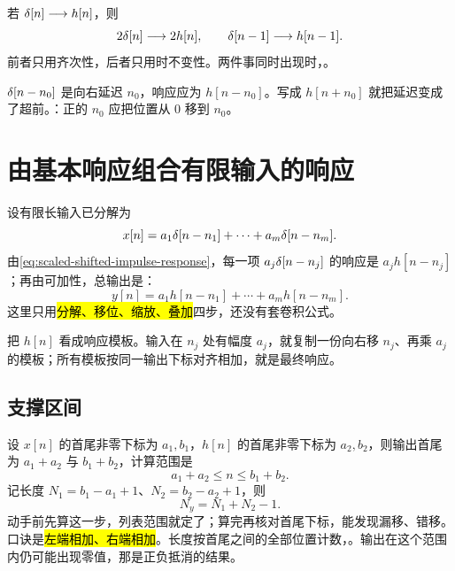 \begin{example}[缩放与移位]
  若 $\delta[n]\longrightarrow h[n]$，则
  \[
    2\delta[n]\longrightarrow2h[n],
    \qquad
    \delta[n-1]\longrightarrow h[n-1].
  \]
  前者只用齐次性，后者只用时不变性。两件事同时出现时，。
\end{example}

\begin{pitfall}[把平移方向写反]
  $\delta[n-n_0]$ 是向右延迟 $n_0$，响应应为 $h[n-n_0]$。写成 $h[n+n_0]$ 就把延迟变成了超前。：正的 $n_0$ 应把位置从 $0$ 移到 $n_0$。
\end{pitfall}

\section{由基本响应组合有限输入的响应}
\label{sec:lti-finite-superposition}

设有限长输入已分解为
\[
  x[n]=a_1\delta[n-n_1]+\cdots+a_m\delta[n-n_m].
\]
由\cref{eq:scaled-shifted-impulse-response}，每一项 $a_j\delta[n-n_j]$ 的响应是 $a_jh[n-n_j]$；再由可加性，总输出是：
\begin{equation}
  y[n]=a_1h[n-n_1]+\cdots+a_mh[n-n_m].
  \label{eq:finite-lti-response-superposition}
\end{equation}
这里只用\hl{分解、移位、缩放、叠加}四步，还没有套卷积公式。

\begin{intuition}
  把 $h[n]$ 看成响应模板。输入在 $n_j$ 处有幅度 $a_j$，就复制一份向右移 $n_j$、再乘 $a_j$ 的模板；所有模板按同一输出下标对齐相加，就是最终响应。
\end{intuition}

\subsection{支撑区间}

设 $x[n]$ 的首尾非零下标为 $a_1,b_1$，$h[n]$ 的首尾非零下标为 $a_2,b_2$，则输出首尾为 $a_1+a_2$ 与 $b_1+b_2$，计算范围是
\begin{equation}
  a_1+a_2\le n\le b_1+b_2.
  \label{eq:finite-response-support}
\end{equation}
记长度 $N_1=b_1-a_1+1$、$N_2=b_2-a_2+1$，则
\begin{equation}
  N_y=N_1+N_2-1.
  \label{eq:finite-response-length}
\end{equation}
动手前先算这一步，列表范围就定了；算完再核对首尾下标，能发现漏移、错移。口诀是\hl{左端相加、右端相加}。长度按首尾之间的全部位置计数，。输出在这个范围内仍可能出现零值，那是正负抵消的结果。

